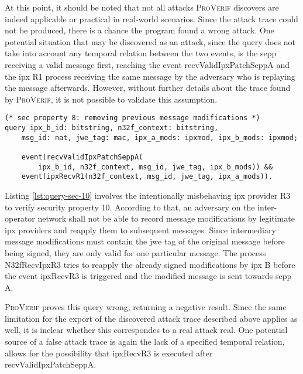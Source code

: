 At this point, it should be noted that not all attacks \textsc{ProVerif} discovers are indeed applicable or practical in real-world scenarios.
Since the attack trace could not be produced, there is a chance the program found a wrong attack.
One potential situation that may be discovered as an attack, since the query does not take into account any temporal relation between the two events, is the \gls{sepp} receiving a valid message first, reaching the event {\sffamily recvValidIpxPatchSeppA} and the \gls{ipx} R1 process receiving the same message by the adversary who is replaying the message afterwards.
However, without further details about the trace found by \textsc{ProVerif}, it is not possible to validate this assumption.

\begin{lstlisting}[caption={Query for security property 8},label={lst:query-sec-8},firstnumber=221]
(* sec property 8: removing previous message modifications *)
query ipx_b_id: bitstring, n32f_context: bitstring,
    msg_id: nat, jwe_tag: mac, ipx_a_mods: ipxmod, ipx_b_mods: ipxmod;

    event(recvValidIpxPatchSeppA(
        ipx_b_id, n32f_context, msg_id, jwe_tag, ipx_b_mods)) &&
    event(ipxRecvR1(n32f_context, msg_id, jwe_tag, ipx_a_mods)).
\end{lstlisting}

Listing \ref{lst:query-sec-10} involves the intentionally misbehaving \gls{ipx} provider R3 to verify security property 10.
According to that, an adversary on the inter-operator network shall not be able to record message modifications by legitimate \gls{ipx} providers and reapply them to subsequent messages.
Since intermediary message modifications must contain the \gls{jwe} tag of the original message before being signed, they are only valid for one particular message.
The process {\sffamily N32fRecvIpxR3} tries to reapply the already signed modifications by \gls{ipx} B before the event {\sffamily ipxRecvR3} is triggered and the modified message is sent towards \gls{sepp} A.

\textsc{ProVerif} proves this query wrong, returning a negative result.
Since the same limitation for the export of the discovered attack trace described above applies as well, it is inclear whether this correspondes to a real attack real.
One potential source of a false attack trace is again the lack of a specified temporal relation, allows for the possibility that {\sffamily ipxRecvR3} is executed after {\sffamily recvValidIpxPatchSeppA}.

